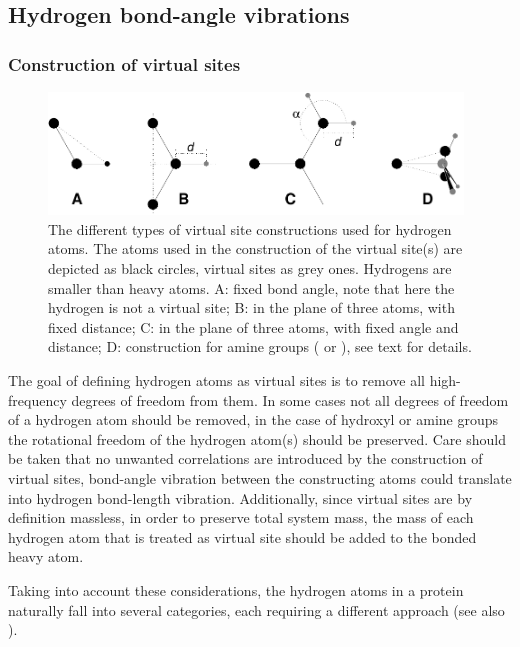\subsection{Hydrogen bond-angle vibrations}
\label{sec:vsitehydro}
\subsubsection{Construction of virtual sites} %
\begin{figure}
\centerline{\includegraphics[width=11cm]{plots/dumtypes}}
\caption[Virtual site constructions for hydrogen atoms.]{The different
types of virtual site constructions used for hydrogen atoms. The atoms
used in the construction of the virtual site(s) are depicted as black
circles, virtual sites as grey ones. Hydrogens are smaller than heavy
atoms. {\sf A}: fixed bond angle, note that here the hydrogen is not a
virtual site; {\sf B}: in the plane of three atoms, with fixed distance;
{\sf C}: in the plane of three atoms, with fixed angle and distance;
{\sf D}: construction for amine groups ({\amine} or {\aminep}), see
text for details.}
\label{fig:vsitehydro}
\end{figure}

The goal of defining hydrogen atoms as virtual sites is to remove all
high-frequency degrees of freedom from them. In some cases not all
degrees of freedom of a hydrogen atom should be removed, {\eg} in the
case of hydroxyl or amine groups the rotational freedom of the
hydrogen atom(s) should be preserved. Care should be taken that no
unwanted correlations are introduced by the construction of virtual
sites, {\eg} bond-angle vibration between the constructing atoms could
translate into hydrogen bond-length vibration. Additionally, since
virtual sites are by definition massless, in order to preserve total
system mass, the mass of each hydrogen atom that is treated as virtual
site should be added to the bonded heavy atom.

Taking into account these considerations, the hydrogen atoms in a
protein naturally fall into several categories, each requiring a
different approach (see also ).

